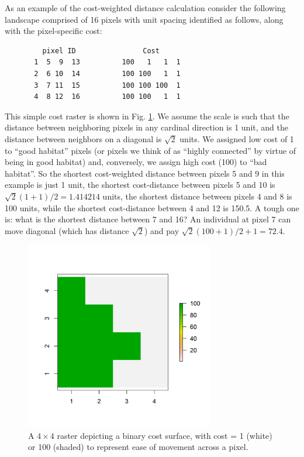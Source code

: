 As an example of the cost-weighted distance calculation consider the
following landscape comprised of 16 pixels with unit spacing
identified as follows, along with the pixel-specific cost:
\begin{center}
\begin{verbatim}
         pixel ID                Cost
       1  5  9  13          100   1   1  1
       2  6 10  14          100 100   1  1
       3  7 11  15          100 100 100  1
       4  8 12  16          100 100   1  1
\end{verbatim}
\end{center}
This simple cost raster is shown in Fig. \ref{ecoldist.fig.raster}. We
assume the scale is such that the distance between neighboring pixels
in any cardinal direction is 1 unit, and the distance between
neighbors on a diagonal is $\sqrt{2}$ units.  We assigned low cost of
1 to ``good habitat'' pixels (or pixels we think of as ``highly
connected'' by virtue of being in good habitat) and, conversely, we
assign high cost (100) to ``bad habitat''. So the shortest
cost-weighted distance between pixels 5 and 9 in this example is just
1 unit, the shortest cost-distance between pixels 5 and 10 is
$\sqrt{2}(1+1)/2 = 1.414214$ units, the shortest distance between
pixels 4 and 8 is 100 units, while the shortest cost-distance between
4 and 12 is 150.5. A tough one is: what is the shortest distance
between 7 and 16? An individual at pixel 7 can move diagonal (which
has distance $\sqrt{2}$) and pay $\sqrt{2}(100+1)/2 + 1 =72.4$. %

\begin{figure}[h]
\begin{center}
\includegraphics[height=3.25in,width=3.25in]{Ch12-EcolDist/figs/raster_2values}
\end{center}
\caption{A $4 \times 4$ raster depicting a binary cost surface, with cost = 1 (white) or 100 (shaded) to represent ease of movement across a pixel.}
\label{ecoldist.fig.raster}
\end{figure}

